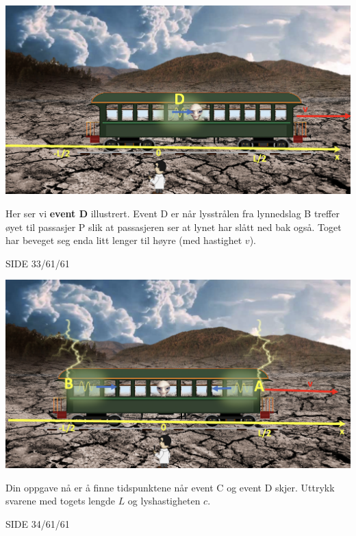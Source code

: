 \documentclass{beamer}
\begin{document}
\begin{frame}
{
\centerline{\includegraphics[scale=0.26]{media/tog3.png}}
Her ser vi {\bf event D} illustrert. Event D er når lysstrålen fra lynnedslag B treffer øyet til passasjer P slik at passasjeren ser at lynet har slått ned bak også. Toget har beveget seg enda litt lenger til høyre (med hastighet $v$).
}{SIDE 33/61/61}

{
\centerline{\includegraphics[scale=0.26]{media/tog1.png}}
Din oppgave nå er å finne tidspunktene når event C og event D skjer. Uttrykk svarene med togets lengde $L$ og lyshastigheten $c$.
}{SIDE 34/61/61}


\end{frame}
\end{document}
